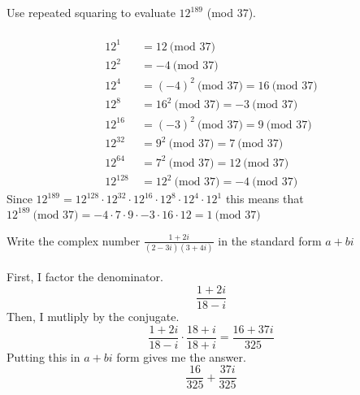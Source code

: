 \documentclass[12pt]{article}
\newenvironment{problem}[2][Problem]{\begin{trivlist}
\item[\hskip \labelsep {\bfseries #1}\hskip \labelsep {\bfseries #2.}]}{\end{trivlist}}
\begin{document}
\begin{problem}{9}
Use repeated squaring to evaluate $12^{189}$ (mod 37).
\\ \\
\begin{align*}
	12^1\ \ &= 12 \ \text{(mod 37)}\\
	12^2\ \ &= -4 \ \text{(mod 37)}\\
	12^4\ \ &= (-4)^2 \ \text{(mod 37)} = 16 \ \text{(mod 37)}\\
	12^8\ \ &= 16^2 \ \text{(mod 37)} = -3 \ \text{(mod 37)} \\ 
	12^{16}\ &= (-3)^2 \ \text{(mod 37)} = 9 \ \text{(mod 37)}\\
	12^{32}\ &= 9^2 \ \text{(mod 37)} = 7 \ \text{(mod 37)}\\
	12^{64}\ &= 7^2 \ \text{(mod 37)} = 12 \ \text{(mod 37)}\\ 
	12^{128}\ &= 12^2 \ \text{(mod 37)} = -4 \ \text{(mod 37)}
\end{align*}
Since $12^{189} = 12^{128} \cdot 12^{32} \cdot 12^{16} \cdot 12^8 \cdot 12^4 \cdot 12^1$ this means that $12^{189} \ \text{(mod 37)} = -4 \cdot 7 \cdot 9 \cdot -3 \cdot 16 \cdot 12 = 1 \ \text{(mod 37)}$
\end{problem}

\begin{problem}{10}
Write the complex number $\frac{1+2i}{(2-3i)(3+4i)}$ in the standard form $a+bi$
\\ \\
First, I factor the denominator.
$$\frac{1 + 2i}{18-i}$$
Then, I mutliply by the conjugate.
$$\frac{1 + 2i}{18-i} \cdot \frac{18+i}{18+i} = \frac{16+37i}{325}$$
Putting this in $a + bi$ form gives me the answer.
$$ \frac{16}{325} + \frac{37i}{325}$$
\end{problem}
\end{document}
